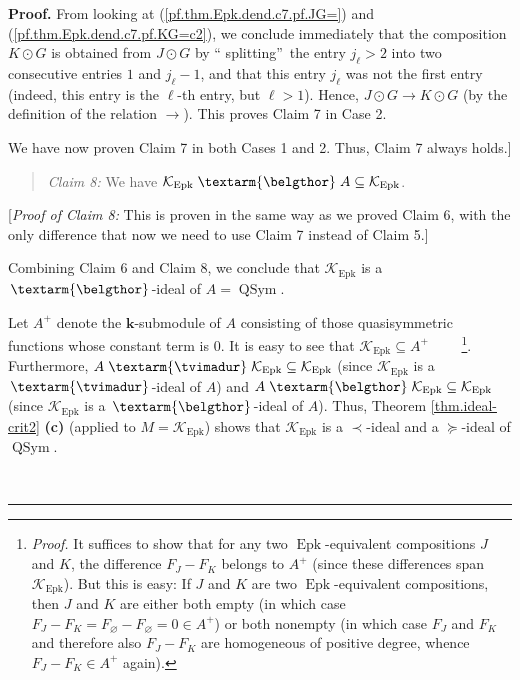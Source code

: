 \documentclass[numbers=enddot,12pt,final,onecolumn,notitlepage]{scrartcl}%
\theoremstyle{definition}
\newenvironment{statement}{\begin{quote}}{\end{quote}}
\newenvironment{proof}[1][Proof]{\noindent\textbf{#1.} }{\ \rule{0.5em}{0.5em}}
\newenvironment{verlong}{}{}
\newcommand{\tvi}{\left. \textarm{\tvimadur} \right.}
\newcommand{\bel}{\left. \textarm{\belgthor} \right.}
\begin{document}
\begin{verlong}
\begin{proof}
From looking at (\ref{pf.thm.Epk.dend.c7.pf.JG=}) and
(\ref{pf.thm.Epk.dend.c7.pf.KG=c2}), we conclude immediately that the
composition $K\odot G$ is obtained from $J\odot G$ by \textquotedblleft
splitting\textquotedblright\ the entry $j_{\ell}>2$ into two consecutive
entries $1$ and $j_{\ell}-1$, and that this entry $j_{\ell}$ was not the first
entry (indeed, this entry is the $\ell$-th entry, but $\ell>1$). Hence,
$J\odot G\rightarrow K\odot G$ (by the definition of the relation
$\rightarrow$). This proves Claim 7 in Case 2.

We have now proven Claim 7 in both Cases 1 and 2. Thus, Claim 7 always holds.]

\begin{statement}
\textit{Claim 8:} We have $\mathcal{K}_{\operatorname{Epk}}\bel
A\subseteq\mathcal{K}_{\operatorname{Epk}}$.
\end{statement}

[\textit{Proof of Claim 8:} This is proven in the same way as we proved Claim
6, with the only difference that now we need to use Claim 7 instead of Claim 5.]

Combining Claim 6 and Claim 8, we conclude that $\mathcal{K}%
_{\operatorname{Epk}}$ is a $\bel$-ideal of $A=\operatorname*{QSym}$.

Let $A^+$ denote the $\mathbf{k}$-submodule of $A$ consisting of those
quasisymmetric functions whose constant term is $0$.
It is easy to see that $\mathcal{K}_{\operatorname{Epk}} \subseteq A^+$
\ \ \ \ \footnote{\textit{Proof.} It suffices to show that for any
two $\operatorname{Epk}$-equivalent compositions $J$ and $K$,
the difference $F_J - F_K$ belongs to $A^+$ (since these differences
span $\mathcal{K}_{\operatorname{Epk}}$).
But this is easy: If $J$ and $K$ are two $\operatorname{Epk}$-equivalent
compositions, then $J$ and $K$ are either both empty (in which case
$F_J - F_K = F_{\varnothing} - F_{\varnothing} = 0 \in A^+$) or both
nonempty (in which case $F_J$ and $F_K$ and therefore also $F_J - F_K$
are homogeneous of positive degree, whence $F_J - F_K \in A^+$ again).}.
Furthermore, $A \tvi \mathcal{K}_{\operatorname{Epk}} \subseteq
\mathcal{K}_{\operatorname{Epk}}$ (since $\mathcal{K}_{\operatorname{Epk}}$
is a $\tvi$-ideal of $A$) and $A \bel \mathcal{K}_{\operatorname{Epk}} \subseteq
\mathcal{K}_{\operatorname{Epk}}$ (since $\mathcal{K}_{\operatorname{Epk}}$
is a $\bel$-ideal of $A$). Thus,
Theorem \ref{thm.ideal-crit2} \textbf{(c)} (applied to $M=\mathcal{K}%
_{\operatorname{Epk}}$) shows that $\mathcal{K}_{\operatorname{Epk}}$ is a
$\left.  \prec\right.  $-ideal and a $\left.  \succeq\right.  $-ideal of
$\operatorname*{QSym}$.


\end{proof}
\end{verlong}
\end{document}

